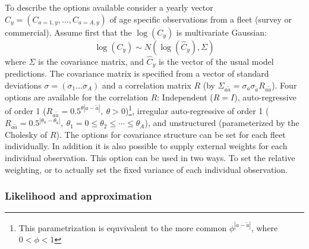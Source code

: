 \documentclass[12pt,letterpaper, leqno]{article}
\begin{document}
To describe the options available consider a yearly vector $C_y=(C_{a=1,y},\ldots,C_{a=A,y})$ of age specific observations from a fleet (survey or commercial). Assume first that the $\log(C_y)$ is multivariate Gaussian: 
\[
\log(C_y) \sim N(\log(\widehat{C}_y), \Sigma)
\]   
where $\Sigma$ is the covariance matrix, and $\hat{C}_y$ is the vector of the usual model predictions. The covariance matrix is specified from a vector of standard deviations $\sigma=(\sigma_1\ldots\sigma_A)$ and a correlation matrix $R$ (by $\Sigma_{a\tilde{a}}=\sigma_a\sigma_{\tilde{a}}R_{a\tilde{a}}$). Four options are available for the correlation $R$: Independent ($R=I$), auto-regressive of order 1 ($R_{a\tilde{a}}=0.5^{\theta|a-\tilde{a}|}, \ \theta>0$)\footnote[$\star$]{This parametrization is equvivalent to the more common $\phi^{|a-\tilde{a}|}$, where $0<\phi<1$}, irregular auto-regressive of order 1 ($R_{a\tilde{a}}=0.5^{|\theta_a-\theta_{\tilde{a}}|}, \ \theta_1=0\leq\theta_2\leq\cdots\leq\theta_A$), and unstructured (parameterized by the Cholesky of $R$). The options for covariance structure can be set for each fleet individually. In addition it is also possible to supply external weights for each individual observation. This option can be used in two ways. To set the relative weighting, or to actually set the fixed variance of each individual observation.

\subsubsection*{Likelihood and approximation}
\end{document}
